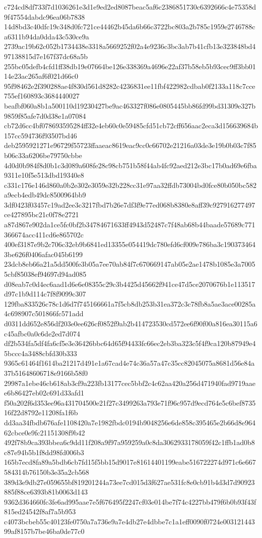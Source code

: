 {c724cd8df733f7d1036261e3d1e9ed2ed8087beac5af6c2386851730c6392666c4e75358d9f47554dabdc96ea06b7838
14d8bd3c40dfc19c348d0fc721ce44462b45da6b66c3722bc803a2b785c1959e2746788ca6311b94da0dda43c530ce9a
2739ac19b62c052b1734438e3318a5669252f02a4e9236c3bc3ab7b41cfb13e323848bd497138815d7e167f37dc68a5b
255bc05defb4cfd1ff38db19e07664be126e338369a4696e22af37b58eb5b93cec9ff3bb0114e23ac265af6f021d66c0
95f98462e2f390288ae4f830d561d8282c4236831ee11fbf422982cdbab0f2133a118c7cce755ef160893c3684440027
beafbf060a8b1a500110d19230427be9ac463327f086e0805445bb86fd99bd31309e327b9859f85afe7d0d38e1a07084
cb72d6cc4bf078693595284ff32e4eb60c0e59485cfd51cb72cff656aac2eca3d156639684b157cc594736f93507bd46
deb2595921271e96729f55723ffaaeac8619eac9cc0c66702e21216a03de3e19b0b03c7f85b06c33a6206be79750cbbe
4d0d0b984f8d0b1c3d089a608fe28c98cb751b58f44ab4fc92aed212e3bc17b0ad69e6fba9311e10f5e513dbd19340e8
c331c176e146d860a0b2e302e3059e32b228cc31e97aa32ffdb73004bd0fce80b050bc582a9ecb4edb49dc8500964bb9
3df0423f03457c19ad2ee3c3217fbd7b26e7df3f9e77ed068b8380e8aff39c927916277497ce427895bc21c0f78e2721
a87d867e902da1ce5fc0bf2b34784671633ff4943d52487c7f48ab68b44baade57689c771366674acc411cd6e865702c
400ef3187e9b2c706c32eb9b6841ed13355e054419dc780efd6cf009e786ba3c1903734643be626f0406afac045b6199
23dcb8eb66a21a5dd500fe3b05a7ee70ab84f7c670669147ab05e2ae1478b1085e3a70055cbf85038ef94697d94ad085
d08eab7c0d4ec6aad1d6e6e08355c29c3b4425d45662f941ce47d5ce2070676b1e113517d97c1b9d114c7f8f9099c307
129fba833526c78c1d6d7f745166661a7f5cb8db253b31ea372c3c78fb8a5ae3ace00285a4c698907c501866fc571add
d0311dd652e856df203e0ee626cf0852f9ab2b414723530cd572ee6f90f00a816ea30115a6c45afbc0a0c6de2ed7d074
df2b534fa5df4fa6cf5e3e36426bbc64d65f94433fc66ec2eb3ba323c5f4f9ca120b87949e45bccc4a3488cbfd30b333
9365c61464f1614ba21217d491e1a67cad4e74c36a57a47c35cc82045075a8681d56e84a37b51648606718e9166b58f0
29987a1ebe46cb618ab3cf9a223fb13177cec5bbf2c4c62aa420a256d471940fad9719aaee6b86427eb02c691d33afd1
f50a202f6d353ee96a431704500e21f27c3499263a793e71f96c957d9ecd764e5c6bef873516f22d8792e11208fa1f6b
dd3aa34fbdb676afe1108420a7e1982fbdc0194b9048256e6de858c395465e2b66d8e96462cbce0e9fc21151308f9b42
492f78b9ca393bbea6c9dd11f208a9f97a959259a0c8da3062933178059f42c1ffb1ad0b8c87e94b5b1f8dd98fd006b3
165b7ecd8fa89a5bdb6cb7fd15f5bb15d9017e81614401199eabe516722274d971c6e667584314b76150b3e35a2cb568
389d3e9db27e059655bf819201244a73ee7cd015d3f627ae531fc8e0cb91b4d3d7d90923885f88ce6393b81b0063d143
9362d364660fc3fe6ad995aae7e5f676495f2247cf03e014be7f74c4227bb479f6b0b93f43f815ed24542f8af7a5b953
c4073bcbeb55c40123fe0750a7a736e9a7e4db27e4dbbe7c1a1eff0090f0724e00312144399af8157b7be46ba0de77c0
}
